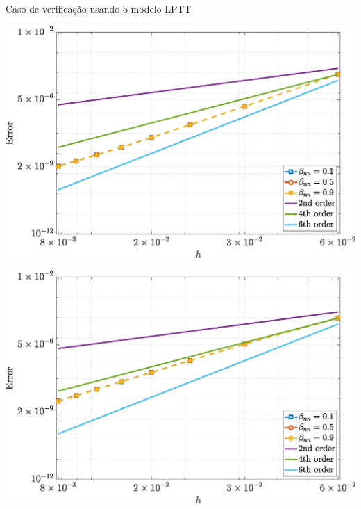 \begin{frame}{Caso de verificação usando o modelo LPTT}
    \centering
    \captionsetup{justification=centering}
    \label{fig:lptt_1}
    \begin{minipage}{0.49\textwidth}
        \centering
        \includegraphics[width=\textwidth]{Figures/NormErr_2nd_Re_100_Wi_1_epsilon_0_xi_0_alphaG_0_Dt_1e-06_at_0.05_tipsim_1_MMS_12_U.eps}
        \label{lptt_u_Case11}
    \end{minipage}
    \hfill
    \begin{minipage}{0.49\textwidth}
        \centering
        \includegraphics[width=\textwidth]{Figures/NormErr_2nd_Re_100_Wi_1_epsilon_0_xi_0_alphaG_0_Dt_1e-06_at_0.05_tipsim_1_MMS_12_V.eps}
        \label{lptt_v_Case11}
    \end{minipage}
\end{frame}

